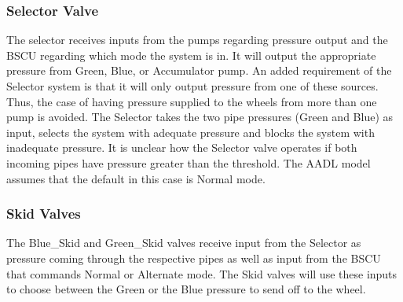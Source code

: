 \subsubsection{Selector Valve}
The selector receives inputs from the pumps regarding pressure output and the BSCU regarding which mode the system is in. It will output the appropriate pressure from Green, Blue, or Accumulator pump. An added requirement of the Selector system is that it will only output pressure from one of these sources. Thus, the case of having pressure supplied to the wheels from more than one pump is avoided. The Selector takes the two pipe pressures (Green and Blue) as input, selects the system with adequate pressure and blocks the system with inadequate pressure. It is unclear how the Selector valve operates if both incoming pipes have pressure greater than the threshold. The AADL model assumes that the default in this case is Normal mode.

\subsubsection{Skid Valves}
The Blue\_Skid and Green\_Skid valves receive input from the Selector as pressure coming through the respective pipes as well as input from the BSCU that commands Normal or Alternate mode. The Skid valves will use these inputs to choose between the Green or the Blue pressure to send off to the wheel.

